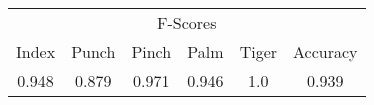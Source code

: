 \documentclass{standalone}
\begin{document}
 
 \begin{tabular}{|c|c|c|c|c ||c|}
\cline{1-6}\multicolumn{6}{|c|}{F-Scores} \\ 
\cline{1-6}Index & Punch & Pinch & Palm & Tiger & Accuracy\\ 
\cline{1-6}0.948 & 0.879 & 0.971 & 0.946 & 1.0 & 0.939\\ 
 \cline{1-6}\hline \end{tabular}
 
\end{document}
